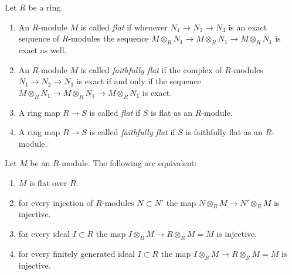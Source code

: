 \begin{definition}
\label{definition-flat}
Let $R$ be a ring.
\begin{enumerate}
\item An $R$-module $M$ is called {\it flat} if whenever
$N_1 \to N_2 \to N_3$ is an exact sequence of $R$-modules
the sequence $M\otimes_R N_1 \to M\otimes_R N_1\to M\otimes_R N_1$
is exact as well.
\item An $R$-module $M$ is called {\it faithfully flat} if the
complex of $R$-modules
$N_1 \to N_2 \to N_3$ is exact if and only if
the sequence $M\otimes_R N_1\to M\otimes_R N_1\to M\otimes_R N_1$
is exact.
\item A ring map $R \to S$ is called {\it flat} if
$S$ is flat as an $R$-module.
\item A ring map $R \to S$ is called {\it faithfully flat} if
$S$ is faithfully flat as an $R$-module.
\end{enumerate}
\end{definition}

\begin{lemma}
\label{lemma-flat}
Let $M$ be an $R$-module. The following are equivalent:
\begin{enumerate}
\item $M$ is flat over $R$.
\label{flat}
\item for every injection of $R$-modules $N \subset N'$
the map $N\otimes_R M \to N'\otimes_R M$ is injective.
\label{injective}
\item for every ideal $I \subset R$ the map
$I\otimes_R M \to R\otimes_R M = M$ is injective.
\label{f-ideal}
\item for every finitely generated ideal $I \subset R$
the map $I\otimes_R M \to R\otimes_R M = M$ is injective.
\label{ffg-ideal}
\end{enumerate}
\end{lemma}


